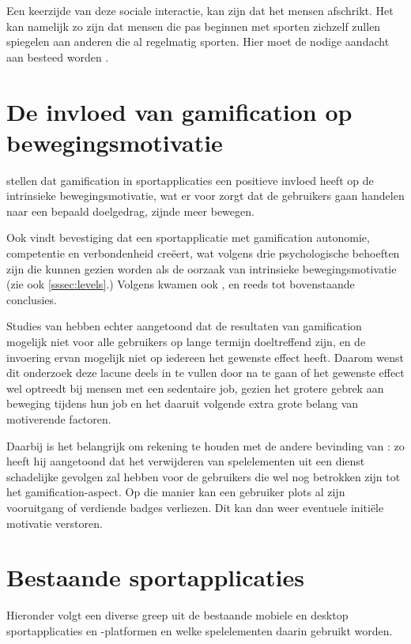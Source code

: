 Een keerzijde van deze sociale interactie, kan zijn dat het mensen afschrikt. Het kan namelijk zo zijn dat mensen die pas beginnen met sporten zichzelf zullen spiegelen aan anderen die al regelmatig sporten. Hier moet de nodige aandacht aan besteed worden \autocite{Jong2010}.

\section{De invloed van gamification op bewegingsmotivatie}

\textcite{Kari2016} stellen dat gamification in sportapplicaties een positieve invloed heeft op de intrinsieke bewegingsmotivatie, wat er voor zorgt dat de gebruikers gaan handelen naar een bepaald doelgedrag, zijnde meer bewegen.

Ook \textcite{Bitrian2020} vindt bevestiging dat een sportapplicatie met gamification autonomie, competentie en verbondenheid creëert, wat volgens \textcite{ManzanoLeon2021} drie psychologische behoeften zijn die kunnen gezien worden als de oorzaak van intrinsieke bewegingsmotivatie (zie ook \ref{sssec:levels}.) Volgens \textcite{Tu2019} kwamen ook \textcite{Lewis2016}, \textcite{Liu2017} en \textcite{Tabak2015} reeds tot bovenstaande conclusies.

Studies van \textcite{Hamari2013a} hebben echter aangetoond dat de resultaten van gamification mogelijk niet voor alle gebruikers op lange termijn doeltreffend zijn, en de invoering ervan mogelijk niet op iedereen het gewenste effect heeft. Daarom wenst dit onderzoek deze lacune deels in te vullen door na te gaan of het gewenste effect wel optreedt bij mensen met een sedentaire job, gezien het grotere gebrek aan beweging tijdens hun job en het daaruit volgende extra grote belang van motiverende factoren.

Daarbij is het belangrijk om rekening te houden met de andere bevinding van \textcite{Hamari2013a}: zo heeft hij aangetoond dat het verwijderen van spelelementen uit een dienst schadelijke gevolgen zal hebben voor de gebruikers die wel nog betrokken zijn tot het gamification-aspect. Op die manier kan een gebruiker plots al zijn vooruitgang of verdiende badges verliezen. Dit kan dan weer eventuele initiële motivatie verstoren.

\section{Bestaande sportapplicaties}
Hieronder volgt een diverse greep uit de bestaande mobiele en desktop sportapplicaties en -platformen en welke spelelementen daarin gebruikt worden.

